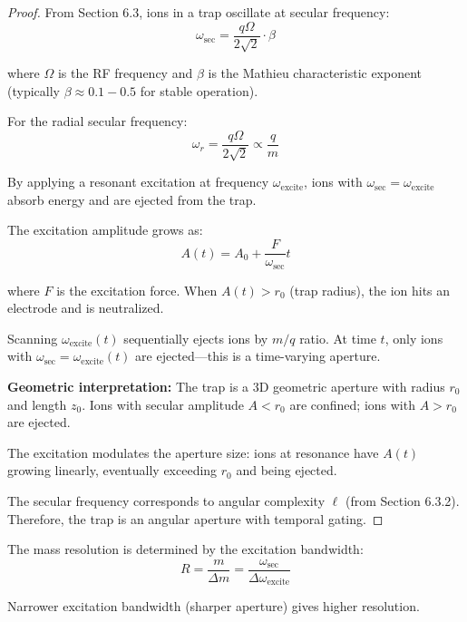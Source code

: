 \begin{proof}
From Section 6.3, ions in a trap oscillate at secular frequency:
\begin{equation}
\omega_{\text{sec}} = \frac{q\Omega}{2\sqrt{2}} \cdot \beta
\end{equation}

where $\Omega$ is the RF frequency and $\beta$ is the Mathieu characteristic exponent (typically $\beta \approx 0.1-0.5$ for stable operation).

For the radial secular frequency:
\begin{equation}
\omega_r = \frac{q\Omega}{2\sqrt{2}} \propto \frac{q}{m}
\end{equation}

By applying a resonant excitation at frequency $\omega_{\text{excite}}$, ions with $\omega_{\text{sec}} = \omega_{\text{excite}}$ absorb energy and are ejected from the trap.

The excitation amplitude grows as:
\begin{equation}
A(t) = A_0 + \frac{F}{\omega_{\text{sec}}} t
\end{equation}

where $F$ is the excitation force. When $A(t) > r_0$ (trap radius), the ion hits an electrode and is neutralized.

Scanning $\omega_{\text{excite}}(t)$ sequentially ejects ions by $m/q$ ratio. At time $t$, only ions with $\omega_{\text{sec}} = \omega_{\text{excite}}(t)$ are ejected—this is a time-varying aperture.

\textbf{Geometric interpretation:} The trap is a 3D geometric aperture with radius $r_0$ and length $z_0$. Ions with secular amplitude $A < r_0$ are confined; ions with $A > r_0$ are ejected.

The excitation modulates the aperture size: ions at resonance have $A(t)$ growing linearly, eventually exceeding $r_0$ and being ejected.

The secular frequency corresponds to angular complexity $\ell$ (from Section 6.3.2). Therefore, the trap is an angular aperture with temporal gating.
\end{proof}

\begin{corollary}
\label{cor:trap_resolution}
The mass resolution is determined by the excitation bandwidth:
\begin{equation}
R = \frac{m}{\Delta m} = \frac{\omega_{\text{sec}}}{\Delta\omega_{\text{excite}}}
\end{equation}

Narrower excitation bandwidth (sharper aperture) gives higher resolution.
\end{corollary}

